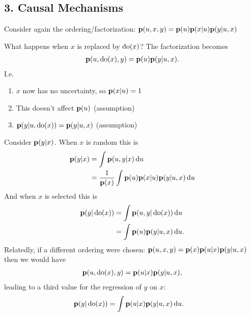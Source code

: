 \subsection{3. Causal Mechanisms}
Consider again the ordering/factorization: $\mathbf{p}(u, x, y) = \mathbf{p}(u)\mathbf{p}(x|u)\mathbf{p}(y|u, x)$
What happens when $x$ is replaced by $\operatorname{\text{do}}(x)$? The factorization becomes
\begin{align*}
  \mathbf{p}(u, \operatorname{\text{do}}(x), y) = \mathbf{p}(u)\mathbf{p}(y|u, x).
\end{align*}
I.e.
\begin{enumerate}
\item $x$ now has no uncertainty, so $\mathbf{p}(x|u) = 1$
\item This doesn't affect $\mathbf{p}(u)$ (assumption)
\item $\mathbf{p}(y|u, \operatorname{\text{do}}(x)) = \mathbf{p}(y|u, x)$ (assumption)
\end{enumerate}
Consider $\mathbf{p}(y|x)$. When $x$ is random this is
\begin{align*}
  \p(y|x)
  &= \int \p(u, y|x) \du \\
  &= \frac{1}{\p(x)}\int \p(u)\p(x|u)\p(y|u, x) \du
\end{align*}
And when $x$ is selected this is
\begin{align*}
  \p(y|\pdo(x))
  &= \int \p(u, y|\pdo(x)) \du \\
  &= \int \p(u)\p(y|u, x) \du.
\end{align*}
Relatedly, if a different ordering were chosen: $\mathbf{p}(u, x, y) = \mathbf{p}(x)\mathbf{p}(u|x)\mathbf{p}(y|u, x)$ then we would have
\begin{align*}
  \mathbf{p}(u, \operatorname{\text{do}}(x), y) = \mathbf{p}(u|x)\mathbf{p}(y|u, x),
\end{align*}
leading to a third value for the regression of $y$ on $x$:
\begin{align*}
  \p(y|\pdo(x))
  &= \int \p(u|x)\p(y|u, x) \du.
\end{align*}
